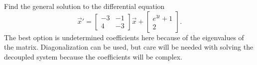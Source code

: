 \documentclass{ximera}
\begin{document}
\begin{exercise}
    Find the general solution to the differential equation
    \begin{equation*}
        {\vec{x}}' = \begin{bmatrix} -3 & -1 \\ 4 & -3 \end{bmatrix} \vec{x} + \begin{bmatrix} e^{3t} + 1 \\ 2 \end{bmatrix}. 
    \end{equation*}
    The best option is undetermined coefficients here because of the eigenvalues of the matrix. Diagonalization can be used, but care will be needed with solving the decoupled system because the coefficients will be complex. 
\end{exercise}
\end{document}
